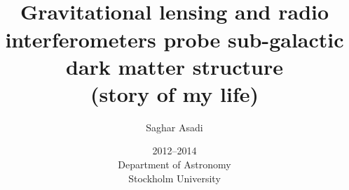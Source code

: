 \documentclass[paper=a4, fontsize=11pt]{scrartcl} %
\title{    
\normalfont \normalsize 
\horrule{0.5pt} \\[0.4cm] %
\huge  Gravitational lensing and radio interferometers probe sub-galactic dark matter structure\\
\large (story of my life) %
\horrule{2pt} \\[0.5cm] %
}
\author{Saghar Asadi} %
\date{\normalsize 2012--2014 \\ Department of Astronomy \\ Stockholm University} %
\numberwithin{equation}{section} %
\numberwithin{figure}{section} %
\numberwithin{table}{section} %
\begin{document}
\maketitle %
\newpage
\tableofcontents
\newpage

\begin{abstract}
\end{abstract}

\end{document}
